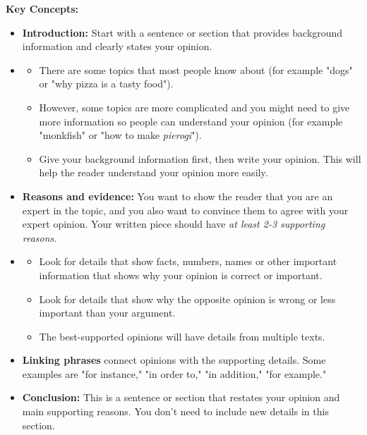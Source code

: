 \documentclass[12pt]{article}
\begin{document}
\begin{tcolorbox}[colframe=black!60, colback=white, 
coltitle=black, colbacktitle=black!15, fonttitle=\bfseries\Large, 
title=Key Concepts and Vocabulary, halign title=center, left=10pt, right=10pt, top=10pt, bottom=15pt]
\textbf{Key Concepts:}
\begin{itemize}
    \item \textbf{Introduction:} Start with a sentence or section that provides background information and clearly states your opinion.
    \item
    \begin{itemize}
        \item There are some topics that most people know about (for example "dogs" or "why pizza is a tasty food").   
        \item However, some topics are more complicated and you might need to give more information so people can understand your opinion (for example "monkfish" or "how to make \textit{pierogi}").
        \item Give your background information first, then write your opinion. This will help the reader understand your opinion more easily.
    \end{itemize}

    \item \textbf{Reasons and evidence:} You want to show the reader that you are an expert in the topic, and you also want to convince them to agree with your expert opinion. Your written piece should have \textit{at least 2-3 supporting reasons.}
    \item
    \begin{itemize}
        \item Look for details that show facts, numbers, names or other important information that shows why your opinion is correct or important.
        \item Look for details that show why the opposite opinion is wrong or less important than your argument.
        \item The best-supported opinions will have details from multiple texts.
    \end{itemize}
    \item \textbf{Linking phrases} connect opinions with the supporting details. Some examples are "for instance," "in order to," "in addition," "for example."
    \item \textbf{Conclusion:} This is a sentence or section that restates your opinion and main supporting reasons. You don't need to include new details in this section.
    \end{itemize}






\end{tcolorbox}
\end{document}
